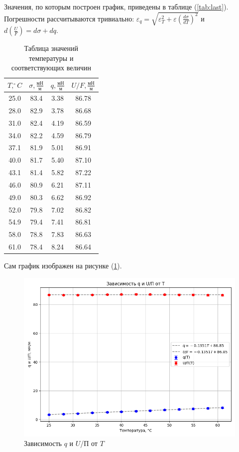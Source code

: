 \documentclass[a4paper,12pt]{article} %
\begin{document}
\begin{enumerate}
  Значения, по которым построен график, приведены в таблице (\ref{tab:last}). Погрешности рассчитываются тривиально: $\varepsilon_q = \sqrt{\varepsilon_T^2 + \varepsilon(\frac{d\sigma}{dT})^2}$ и $d(\frac{U}{F}) = d\sigma + dq$.

  \begin{table}[h!]
    \centering
    \begin{tabular}{|c|c|c|c|}
    \hline
    $T, ^\circ C$ & $\sigma, \frac{\text{мН}}{\text{м}}$ & $q, \frac{\text{мН}}{\text{м}}$ & $U/F, \frac{\text{мН}}{\text{м}}$ \\
    \hline
    25.0 & 83.4 & 3.38 & 86.78 \\
    28.0 & 82.9 & 3.78 & 86.68 \\
    31.0 & 82.4 & 4.19 & 86.59 \\
    34.0 & 82.2 & 4.59 & 86.79 \\
    37.1 & 81.9 & 5.01 & 86.91 \\
    40.0 & 81.7 & 5.40 & 87.10 \\
    43.1 & 81.4 & 5.82 & 87.22 \\
    46.0 & 80.9 & 6.21 & 87.11 \\
    49.0 & 80.3 & 6.62 & 86.92 \\
    52.0 & 79.8 & 7.02 & 86.82 \\
    54.9 & 79.4 & 7.41 & 86.81 \\
    58.0 & 78.8 & 7.83 & 86.63 \\
    61.0 & 78.4 & 8.24 & 86.64 \\
    \hline
    \end{tabular}
    \caption{Таблица значений температуры и соответствующих величин}
    \end{table}

  Сам график изображен на рисунке (\ref{fig:last_graph}).

  \begin{figure}[h!]
    \centering
    \includegraphics[scale = 0.75]{graph_new.png}
    \caption{Зависимость $q$ и $U$/П от $T$}
    \label{fig:last_graph}
  \end{figure}


\end{enumerate}
\end{document}
